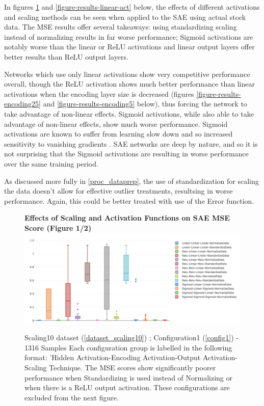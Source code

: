 \documentclass[a4paper,11pt,oneside]{article}
\theoremstyle{plain}
\theoremstyle{definition}
\begin{document}
In figures \ref{figure-results-scaling-and-relu} and \ref{figure-results-linear-act} below, the effects of different activations and scaling methods can be seen when applied to the SAE using actual stock data. The MSE results offer several takeaways: using standardizing scaling instead of normalizing results in far worse performance; Sigmoid activations are notably worse than the linear or ReLU activations and linear output layers offer better results than ReLU output layers. \newline

 Networks which use only linear activations show very competitive performance overall, though the ReLU activation shows much better performance than linear activations when the encoding layer size is decreased (figures \ref{figure-results-encoding25} and \ref{figure-results-encoding5} below), thus forcing the network to take advantage of non-linear effects. Sigmoid activations, while also able to take advantage of non-linear effects, show much worse performance. Sigmoid activations are known to suffer from learning slow down and so increased sensitivity to vanishing gradients . SAE networks are deep by nature, and so it is not surprising that the Sigmoid activations are resulting in worse performance over the same training period. \newline

As discussed more fully in \ref{proc_dataprep}, the use of standardization for scaling the data doesn't allow for effective outlier treatments, resultsing in worse performance. Again, this could be better treated with use of the Error function. \newline

\begin{figure}[H]
	\centering
		\textbf{Effects of Scaling and Activation Functions on SAE MSE Score (Figure 1/2)}
		\includegraphics[scale=0.4]{images/results/linearity/0Scaling_and_Activation_Combos_Min_MSE.png}
		\caption{Scaling10 dataset (\ref{dataset_scaling10}) ; Configuration1 (\ref{config1}) - 1316 Samples
			\newline \newline Each configuration group is labelled in the following format: 'Hidden Activation-Encoding Activation-Output Activation-Scaling Technique. The MSE scores show significantly poorer performance when Standardizing is used instead of Normalizing or when there is a ReLU output activation. These configurations are excluded from the next figure.}
		\label{figure-results-scaling-and-relu}
\end{figure}
\end{document}

